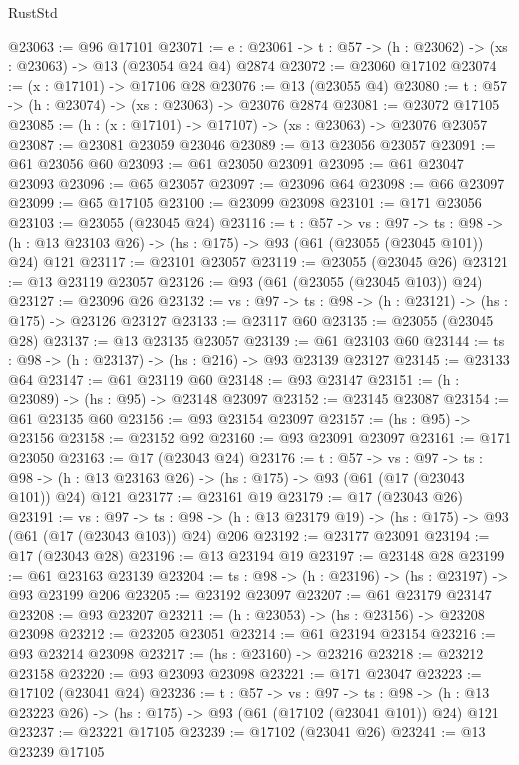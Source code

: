 \begin{lexlean}{RustStd}
\begin{coremodule}
@23063 := @96 @17101
@23071 := {e : @23061} -> {t : @57} -> (h : @23062) -> (xs : @23063) -> @13 (@23054 @24 @4) @2874
@23072 := @23060 @17102
@23074 := (x : @17101) -> @17106 @28
@23076 := @13 (@23055 @4)
@23080 := {t : @57} -> (h : @23074) -> (xs : @23063) -> @23076 @2874
@23081 := @23072 @17105
@23085 := (h : (x : @17101) -> @17107) -> (xs : @23063) -> @23076 @23057
@23087 := @23081 @23059 @23046
@23089 := @13 @23056 @23057
@23091 := @61 @23056 @60
@23093 := @61 @23050 @23091
@23095 := @61 @23047 @23093
@23096 := @65 @23057
@23097 := @23096 @64
@23098 := @66 @23097
@23099 := @65 @17105
@23100 := @23099 @23098
@23101 := @171 @23056
@23103 := @23055 (@23045 @24)
@23116 := {t : @57} ->
  {vs : @97} ->
  {ts : @98} -> (h : @13 @23103 @26) -> (hs : @175) -> @93 (@61 (@23055 (@23045 @101)) @24) @121
@23117 := @23101 @23057
@23119 := @23055 (@23045 @26)
@23121 := @13 @23119 @23057
@23126 := @93 (@61 (@23055 (@23045 @103)) @24)
@23127 := @23096 @26
@23132 := {vs : @97} -> {ts : @98} -> (h : @23121) -> (hs : @175) -> @23126 @23127
@23133 := @23117 @60
@23135 := @23055 (@23045 @28)
@23137 := @13 @23135 @23057
@23139 := @61 @23103 @60
@23144 := {ts : @98} -> (h : @23137) -> (hs : @216) -> @93 @23139 @23127
@23145 := @23133 @64
@23147 := @61 @23119 @60
@23148 := @93 @23147
@23151 := (h : @23089) -> (hs : @95) -> @23148 @23097
@23152 := @23145 @23087
@23154 := @61 @23135 @60
@23156 := @93 @23154 @23097
@23157 := (hs : @95) -> @23156
@23158 := @23152 @92
@23160 := @93 @23091 @23097
@23161 := @171 @23050
@23163 := @17 (@23043 @24)
@23176 := {t : @57} ->
  {vs : @97} ->
  {ts : @98} -> (h : @13 @23163 @26) -> (hs : @175) -> @93 (@61 (@17 (@23043 @101)) @24) @121
@23177 := @23161 @19
@23179 := @17 (@23043 @26)
@23191 := {vs : @97} ->
  {ts : @98} -> (h : @13 @23179 @19) -> (hs : @175) -> @93 (@61 (@17 (@23043 @103)) @24) @206
@23192 := @23177 @23091
@23194 := @17 (@23043 @28)
@23196 := @13 @23194 @19
@23197 := @23148 @28
@23199 := @61 @23163 @23139
@23204 := {ts : @98} -> (h : @23196) -> (hs : @23197) -> @93 @23199 @206
@23205 := @23192 @23097
@23207 := @61 @23179 @23147
@23208 := @93 @23207
@23211 := (h : @23053) -> (hs : @23156) -> @23208 @23098
@23212 := @23205 @23051
@23214 := @61 @23194 @23154
@23216 := @93 @23214 @23098
@23217 := (hs : @23160) -> @23216
@23218 := @23212 @23158
@23220 := @93 @23093 @23098
@23221 := @171 @23047
@23223 := @17102 (@23041 @24)
@23236 := {t : @57} ->
  {vs : @97} ->
  {ts : @98} -> (h : @13 @23223 @26) -> (hs : @175) -> @93 (@61 (@17102 (@23041 @101)) @24) @121
@23237 := @23221 @17105
@23239 := @17102 (@23041 @26)
@23241 := @13 @23239 @17105

\end{coremodule}
\end{lexlean}
